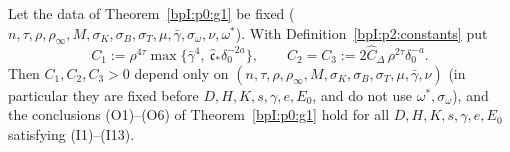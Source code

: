 \begin{theorem}\label{bpI:p2:g1}
Let the data of Theorem~\ref{bpI:p0:g1} be fixed ($n,\tau,\rho,\rho_\infty,M,\sigma_K,\sigma_B,\sigma_T,\mu,\bar\gamma,\sigma_\omega,\nu,\omega^*$). With Definition~\ref{bpI:p2:constants} put
\[
C_1:=\rho^{4\tau}\max\{\bar\gamma^4,\ \hat{\mathfrak c}_*\delta_0^{-2a}\},\qquad C_2=C_3:=2\hat C_\Delta\,\rho^{2\tau}\delta_0^{-a}.
\]
Then $C_1,C_2,C_3>0$ depend only on $(n,\tau,\rho,\rho_\infty,M,\sigma_K,\sigma_B,\sigma_T,\mu,\bar\gamma,\nu)$ (in particular they are fixed before $D,H,K,s,\gamma,e,E_0$, and do not use $\omega^*,\sigma_\omega$), and the conclusions (O1)--(O6) of Theorem~\ref{bpI:p0:g1} hold for all $D,H,K,s,\gamma,e,E_0$ satisfying (I1)--(I13).
\end{theorem}
